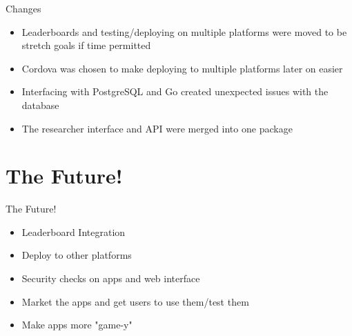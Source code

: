 \documentclass[aspectratio=169]{beamer}
\begin{document}
\begin{frame}{Changes}
	\begin{itemize}

		\item Leaderboards and testing/deploying on multiple platforms were moved to
					be stretch goals if time permitted

		\item Cordova was chosen to make deploying to multiple platforms later on
					easier

		\item Interfacing with PostgreSQL and Go created unexpected issues with the database

    \item The researcher interface and API were merged into one package

	\end{itemize}
\end{frame}

\section{The Future!}

\begin{frame}{The Future!}
	\begin{itemize}
		
		\item Leaderboard Integration

		\item Deploy to other platforms

		\item Security checks on apps and web interface

		\item Market the apps and get users to use them/test them

		\item Make apps more "game-y"

	\end{itemize}
\end{frame}

\end{document}
